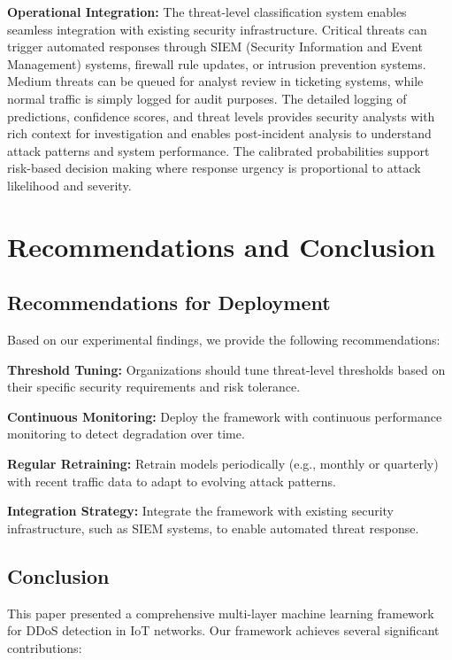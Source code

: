\documentclass[conference]{IEEEtran}
\begin{document}
\textbf{Operational Integration:} The threat-level classification system enables seamless integration with existing security infrastructure. Critical threats can trigger automated responses through SIEM (Security Information and Event Management) systems, firewall rule updates, or intrusion prevention systems. Medium threats can be queued for analyst review in ticketing systems, while normal traffic is simply logged for audit purposes. The detailed logging of predictions, confidence scores, and threat levels provides security analysts with rich context for investigation and enables post-incident analysis to understand attack patterns and system performance. The calibrated probabilities support risk-based decision making where response urgency is proportional to attack likelihood and severity.


\section{Recommendations and Conclusion}

\subsection{Recommendations for Deployment}

Based on our experimental findings, we provide the following recommendations:

\textbf{Threshold Tuning:} Organizations should tune threat-level thresholds based on their specific security requirements and risk tolerance.

\textbf{Continuous Monitoring:} Deploy the framework with continuous performance monitoring to detect degradation over time.

\textbf{Regular Retraining:} Retrain models periodically (e.g., monthly or quarterly) with recent traffic data to adapt to evolving attack patterns.

\textbf{Integration Strategy:} Integrate the framework with existing security infrastructure, such as SIEM systems, to enable automated threat response.

\subsection{Conclusion}

This paper presented a comprehensive multi-layer machine learning framework for DDoS detection in IoT networks. Our framework achieves several significant contributions:
\end{document}

